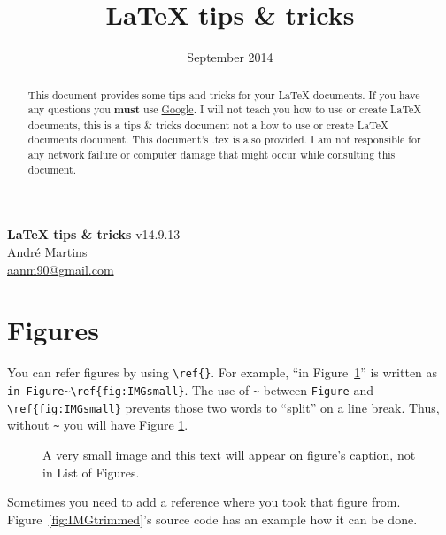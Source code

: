 \documentclass[a4paper,12pt]{article}
\title{{\LaTeX} tips \& tricks}
\date{September 2014}
\makeatletter
\newcommand{\version}{v14.9.13}
\newcommand{\auth}{Andr{{\'e}} Martins}
\newcommand{\authmail}{\small \href{mailto:aanm90@gmail.com}{aanm90@gmail.com}}
\newcommand{\doctitle}{{\LaTeX} tips \& tricks}
\newcommand{\firsttitle}{{\Large \bf{\doctitle}}}
\makeatother
\begin{document}
\begin{center}
	{\firsttitle} {\version} \\
	{\auth} \\
	{\authmail} \\
\end{center}

\begin{abstract}
This document provides some tips and tricks for your {\LaTeX} documents. If you have any questions you \textbf{must} use \href{www.google.com}{Google}. I will not teach you how to use or create {\LaTeX} documents, this is a tips \& tricks document not a how to use or create {\LaTeX} documents document. This document's .tex is also provided. I am not responsible for any network failure or computer damage that might occur while consulting this document.
\end{abstract}


\tableofcontents

\listoffigures

\section{Figures}

You can refer figures by using \verb|\ref{}|. For example, ``in Figure~\ref{fig:IMGsmall}'' is written as \verb+in Figure~\ref{fig:IMGsmall}+. The use of \verb|~| between \verb|Figure| and \verb|\ref{fig:IMGsmall}| prevents those two words to ``split'' on a line break. Thus, without \verb|~| you will have Figure \ref{fig:IMGsmall}.

\begin{figure}[H]
\centering
{}
\caption[A very small image and this text will appear in list of figures.]{A very small image and this text will appear on figure's caption, not in List of Figures.}
\label{fig:IMGsmall}
\end{figure}



Sometimes you need to add a reference where you took that figure from. Figure~\ref{fig:IMGtrimmed}'s source code has an example how it can be done.

\end{document}
